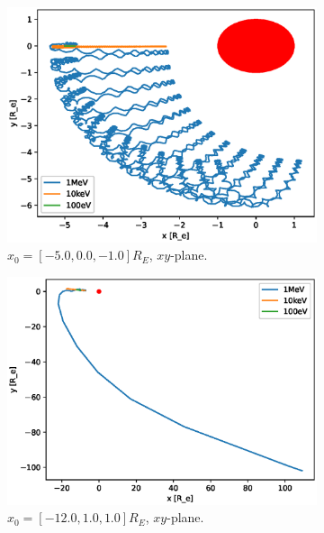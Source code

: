 \begin{figure}
\begin{subfigure}[h]{0.45\textwidth}
        \includegraphics[width=\textwidth]{Figures/Trajectories/trajectories-xy-36.eps}
        \caption{$x_0 = [-5.0,0.0,-1.0]R_E$, $xy$-plane.}
        \label{fig:traj-c}
    \end{subfigure}
    \hfill
    \begin{subfigure}[h]{0.45\textwidth}
        \includegraphics[width=\textwidth]{Figures/Trajectories/trajectories-xy-98.eps}
        \caption{$x_0 = [-12.0,1.0,1.0]R_E$, $xy$-plane.}
        \label{fig:traj-d}
    \end{subfigure}
    \vfill
    \begin{subfigure}[h]{0.45\textwidth}

\end{subfigure}
\end{figure}
